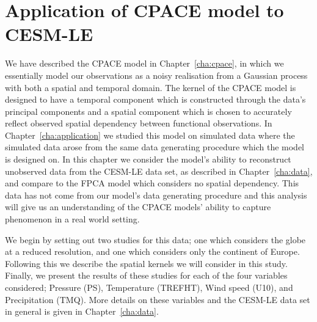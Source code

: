 
\chapter{Application of  CPACE model  to CESM-LE\label{cha:real_application}}  %

\ifpdf
    \graphicspath{{Chapter7/Figs/Raster/}{Chapter7/Figs/PDF/}{Chapter7/Figs/}}
\else
    \graphicspath{{Chapter7/Figs/Vector/}{Chapter7/Figs/}}
\fi


We have described the CPACE model in Chapter~\ref{cha:cpace}, in which we essentially model our observations as a noisy realisation from a Gaussian process with both a spatial and temporal domain.
The kernel of the CPACE model is designed to have a temporal component which is constructed through the data's principal components and a spatial component which is chosen to accurately reflect observed spatial dependency between functional observations.
In Chapter~\ref{cha:application} we studied this model on simulated data where the simulated data arose from the same data generating procedure which the model is designed on.
In this chapter we consider the model's ability to reconstruct unobserved data from the CESM-LE data set, as described in Chapter~\ref{cha:data}, and compare to the FPCA model which considers no spatial dependency.
This data has not come from our model's data generating procedure and this analysis will give us an understanding of the CPACE models' ability to capture phenomenon in a real world setting. 

We begin by setting out two studies for this data; one which considers the globe at a reduced resolution, and one which considers only the continent of Europe.
Following this we describe the spatial kernels we will consider in this study.
Finally, we present the results of these studies for each of the four variables considered; Pressure (PS), Temperature (TREFHT), Wind speed (U10), and Precipitation (TMQ).
More details on these variables and the CESM-LE data set in general is given in Chapter~\ref{cha:data}.

